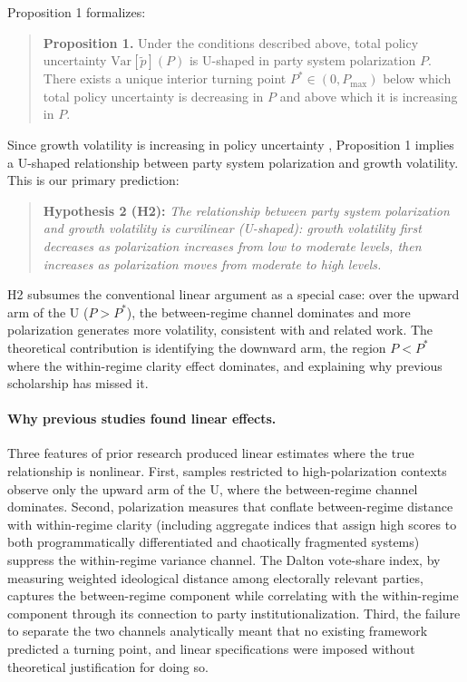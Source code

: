 \documentclass[12pt]{article}
\begin{document}
Proposition 1 formalizes:

\begin{quote}
\textbf{Proposition 1.} Under the conditions described above, total policy
uncertainty $\text{Var}[\tilde{p}](P)$ is U-shaped in party system
polarization $P$. There exists a unique interior turning point $P^* \in
(0, P_{\max})$ below which total policy uncertainty is decreasing in $P$
and above which it is increasing in $P$.
\end{quote}

\noindent Since growth volatility is increasing in policy uncertainty
\citep{BejarMukherjee2011, Fatás2003, Baker2016, FernandezVillaverde2015},
Proposition 1 implies a
U-shaped relationship between party system polarization and growth volatility.
This is our primary prediction:

\begin{quote}
\textbf{Hypothesis 2 (H2):} \textit{The relationship between party system
polarization and growth volatility is curvilinear (U-shaped): growth
volatility first decreases as polarization increases from low to moderate
levels, then increases as polarization moves from moderate to high levels.}
\end{quote}

\noindent H2 subsumes the conventional linear argument as a special case:
over the upward arm of the U ($P > P^*$), the between-regime channel
dominates and more polarization generates more volatility, consistent with
\citet{Frye2002} and related work. The theoretical contribution is
identifying the downward arm, the region $P < P^*$ where the within-regime
clarity effect dominates, and explaining why previous scholarship has
missed it.

\paragraph{Why previous studies found linear effects.} Three features of
prior research produced linear estimates where the true relationship is
nonlinear. First, samples restricted to high-polarization contexts
\citep{Frye2002} observe only the upward arm of the U, where the between-regime
channel dominates. Second, polarization measures that conflate
between-regime distance with within-regime clarity (including aggregate
indices that assign high scores to both programmatically differentiated and
chaotically fragmented systems) suppress the within-regime variance
channel. The Dalton vote-share index, by measuring weighted ideological
distance among electorally relevant parties, captures the between-regime
component while correlating with the within-regime component through its
connection to party institutionalization. Third, the failure to separate
the two channels analytically meant that no existing framework predicted
a turning point, and linear specifications were imposed without theoretical
justification for doing so.
\end{document}
